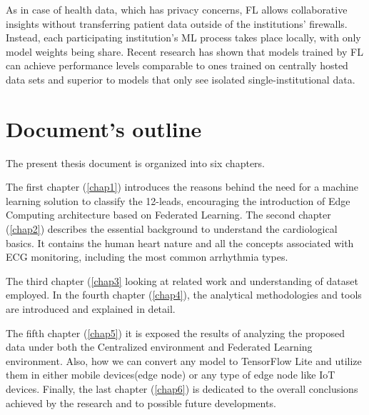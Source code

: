 As in case of health data, which has privacy concerns, FL allows collaborative insights without transferring patient data outside of the institutions’ firewalls. Instead, each participating institution’s ML process takes place locally, with only model weights being share. Recent research has shown that models trained by FL can achieve performance levels comparable to ones trained on centrally hosted data sets and superior to models that only see isolated single-institutional data. \cite{Rieke_2020}





\section{Document's outline} \label{doc_struct}

The present thesis document is organized into six chapters. 

The first chapter (\ref{chap1}) introduces the reasons behind the need for a machine learning solution to classify the 12-leads, encouraging the introduction of Edge Computing architecture based on Federated Learning. The second chapter (\ref{chap2}) describes the essential background to understand the cardiological basics. It contains the human heart nature and all the concepts associated with ECG monitoring, including the most common arrhythmia types.

The third chapter (\ref{chap3} looking at related work and understanding of dataset employed. In the fourth chapter (\ref{chap4}), the analytical methodologies and tools are introduced and explained in detail. 

The fifth chapter (\ref{chap5}) it is exposed the results of analyzing the proposed data under both the Centralized environment and Federated Learning environment. Also, how we can convert any model to TensorFlow Lite and utilize them in either mobile devices(edge node) or any type of edge node like IoT devices.  Finally, the last chapter (\ref{chap6}) is dedicated to the overall conclusions achieved by the research and to possible future developments.
